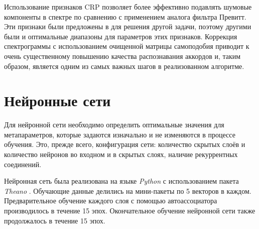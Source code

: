 \medskip

Использование признаков CRP позволяет более эффективно подавлять шумовые
компоненты в спектре по сравнению с применением аналога фильтра Превитт. Эти
признаки были предложены в \cite{Mueller2009} для решения другой задачи, поэтому
другими были и оптимальные диапазоны для параметров этих признаков. Коррекция
спектрограммы с использованием очищенной матрицы самоподобия приводит к очень
существенному повышению качества распознавания аккордов и, таким образом,
является одним из самых важных шагов в реализованном алгоритме.


\section{Нейронные сети} \label{sect3_nn}

Для нейронной сети необходимо определить оптимальные значения для
метапараметров, которые задаются изначально и не изменяются в процессе обучения.
Это, прежде всего, конфигурация сети: количество скрытых слоёв и количество
нейронов во входном и в скрытых слоях, наличие рекуррентных соединений.

Нейронная сеть была реализована на языке \emph{Python} с использованием пакета
\emph{Theano} \cite{Bergstra2010}. Обучающие данные делились на мини-пакеты по 5
векторов в каждом. Предварительное обучение каждого слоя с помощью
автоассоциатора производилось в течение 15 эпох. Окончательное обучение
нейронной сети также продолжалось в течение 15 эпох.

